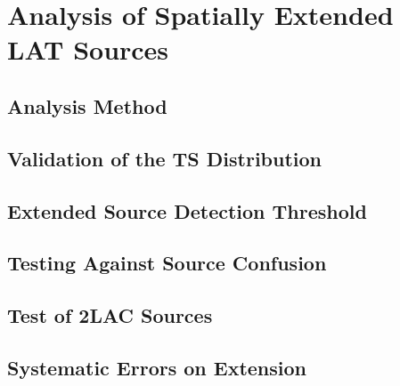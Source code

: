 
\chapter{Analysis of Spatially Extended LAT Sources}

\section{Analysis Method}

\section{Validation of the TS Distribution}

\section{Extended Source Detection Threshold}

\section{Testing Against Source Confusion}

\section{Test of 2LAC Sources}

\section{Systematic Errors on Extension}

